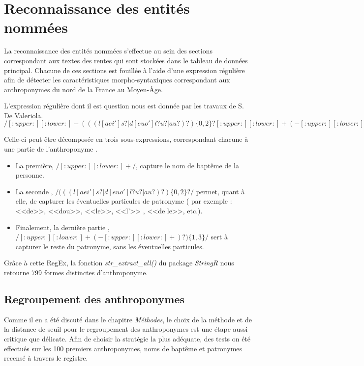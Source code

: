 
\section{Reconnaissance des entités nommées}
La reconnaissance des entités nommées s'effectue au sein des sections correspondant aux textes des rentes qui sont stockées dans le tableau de données principal. Chacune de ces sections est fouillée à l'aide d'une expression régulière afin de détecter les caractéristiques morpho-syntaxiques correspondant aux anthroponymes du  nord  de la France au Moyen-Âge.

L'expression régulière dont il est question nous est donnée par les travaux de S. De Valeriola. \\
 $/[:upper:][:lower:]+ (((l[aei']s?|d[euo']l?u?|au?)?)\{0,2\} ?[:upper:][:lower:]+(-[:upper:][:lower:]+)?)\{1,3\}/$

Celle-ci peut être décomposée en trois sous-expressions, correspondant chacune à une partie de l'anthroponyme \parencite{de_valeriola_lordinateur_2021}.
\begin{itemize}
    \item La première, $/[:upper:][:lower:]+ /$, capture le nom de baptême de la personne.
    \item La seconde , $/(((l[aei']s?|d[euo']l?u?|au?)?)\{0,2\} ?/ $ permet, quant à elle, de capturer les éventuelles particules de patronyme ( par exemple : <<de>>, <<dou>>, <<le>>, <<l'>> , <<de le>>, etc.).
    \item Finalement,  la dernière partie , $ /[:upper:][:lower:]+(-[:upper:][:lower:]+)?)\{1,3\}/ $  sert à capturer le reste du patronyme, sans les éventuelles particules.
\end{itemize}

Grâce à cette RegEx, la fonction \textit{str\_extract\_all()} du package \textit{StringR} nous retourne 799 formes distinctes d'anthroponyme. 


\subsection{Regroupement des anthroponymes}
Comme  il en a été discuté dans le chapitre \textit{Méthodes}, le choix de la méthode et de la distance de seuil pour le regroupement des anthroponymes est une étape aussi critique que délicate.
Afin de choisir la stratégie la plus adéquate, des tests on été effectués sur les 100 premiers anthroponymes, noms de baptême et patronymes recensé à travers le registre.

